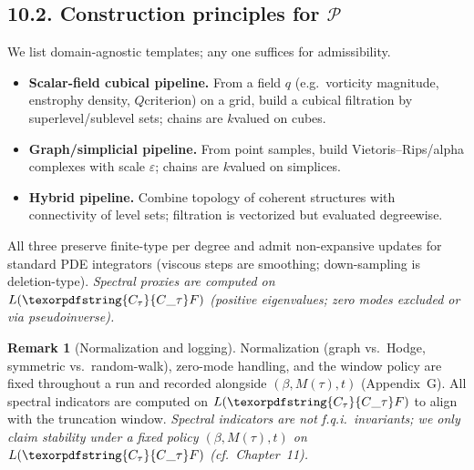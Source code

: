 \documentclass[11pt]{article}
\DeclareRobustCommand{\hyp}{\nobreakdash-}
\numberwithin{equation}{section}
\theoremstyle{definition}
\newtheorem{remark}[theorem]{Remark}
\DeclareRobustCommand{\Ctau}{\texorpdfstring{\ensuremath{C_{\tau}}}{C\_\tau}}
\begin{document}
\subsection*{10.2. Construction principles for \texorpdfstring{$\mathcal{P}$}{P}}
We list domain\hyp agnostic templates; any one suffices for admissibility.
\begin{itemize}
  \item \textbf{Scalar\hyp field cubical pipeline.} From a field \(q\) (e.g.\ vorticity magnitude, enstrophy density, \(Q\)\nobreakdash criterion) on a grid, build a cubical filtration by superlevel/sublevel sets; chains are \(k\)\nobreakdash valued on cubes.
  \item \textbf{Graph/simplicial pipeline.} From point samples, build Vietoris–Rips/alpha complexes with scale \(\varepsilon\); chains are \(k\)\nobreakdash valued on simplices.
  \item \textbf{Hybrid pipeline.} Combine topology of coherent structures with connectivity of level sets; filtration is vectorized but evaluated degreewise.
\end{itemize}
All three preserve finite\hyp type per degree and admit non\hyp expansive updates for standard PDE integrators (viscous steps are smoothing; down\hyp sampling is deletion\hyp type).
\emph{Spectral proxies are computed on \(L(\Ctau F)\) (positive eigenvalues; zero modes excluded or via pseudoinverse).}

\begin{remark}[Normalization and logging]
Normalization (graph vs.\ Hodge, symmetric vs.\ random\hyp walk), zero\hyp mode handling, and the window policy are fixed throughout a run and recorded alongside \((\beta,M(\tau),t)\) (Appendix~G).
All spectral indicators are computed on \(L(\Ctau F)\) to align with the truncation window.
\emph{Spectral indicators are not f.q.i.\ invariants; we only claim stability under a fixed policy \((\beta,M(\tau),t)\) on \(L(\Ctau F)\) (cf.\ Chapter~11).}
\end{remark}
\end{document}
